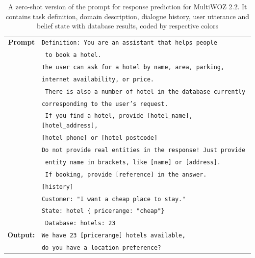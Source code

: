\begin{table}[tp]
    \centering\small
    \begin{tabular}{rl}
      \toprule
      \textbf{Prompt} & \texttt{{\color{cyan!80!yellow!80!black!100 }Definition: You are an assistant that helps people}} \\
      & \texttt{{\color{cyan!80!yellow!80!black!100} to book a hotel.}} \\
& \texttt{{\color{green!100!yellow!70!black!100 }The user can ask for a hotel by name, area, parking, }}\\
& \texttt{{\color{green!100!yellow!70!black!100 }internet availability, or price.}} \\
& \texttt{{\color{green!100!yellow!70!black!100 } There is also a number of hotel in the database currently }} \\
& \texttt{{\color{green!100!yellow!70!black!100 }corresponding to the user's request. }}\\
& \texttt{{\color{green!100!yellow!70!black!100 } If you find a hotel, provide [hotel\_name], [hotel\_address], }} \\
& \texttt{{\color{green!100!yellow!70!black!100 }[hotel\_phone] or [hotel\_postcode]}} \\
& \texttt{{\color{green!100!yellow!70!black!100 }Do not provide real entities in the response! Just provide}}\\
& \texttt{{\color{green!100!yellow!70!black!100 } entity name in brackets, like [name] or [address].} }\\
& \texttt{{\color{cyan!80!yellow!80!black!100 } If booking, provide [reference] in the answer. }} \\
& \texttt{{\color{red!100!yellow!70!black!100!}[history] }} \\
& \texttt{{\color{orange!50!yellow!90!black!100!}Customer: "I want a cheap place to stay." }}\\
& \texttt{{\color{magenta!100!yellow!70!black!100!}State: hotel \{ pricerange: "cheap"\} }} \\
& \texttt{{\color{magenta!100!yellow!70!black!100!} Database: hotels: 23 }}\\
      \midrule
      \textbf{Output:} & \texttt{We have 23 [pricerange] hotels available,} \\
      & \texttt{do you have a location preference?} \\
      \bottomrule
  \end{tabular}
  \caption{A zero-shot version of the prompt for response prediction for MultiWOZ 2.2.
  It contains {\color{cyan!80!yellow!80!black!100} task definition},  {\color{green!100!yellow!70!black!100!}domain description}, {\color{red!100!yellow!70!black!100!} dialogue history}, {\color{orange!50!yellow!90!black!100!} user utterance} and {\color{magenta!100!yellow!70!black!100!} belief state with database results}, coded by respective colors}
  \label{07_tab:zero-shot-response}
\end{table}
